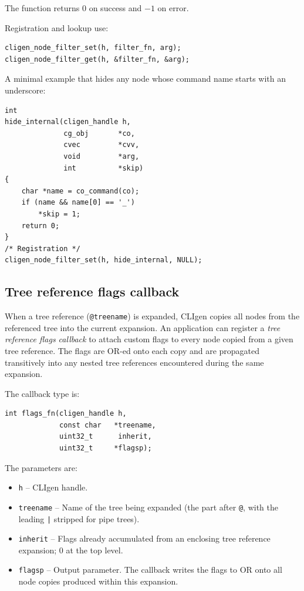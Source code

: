 \documentclass[a4paper, 10pt] {article}
\begin{document}
The function returns 0 on success and $-1$ on error.

Registration and lookup use:
\begin{verbatim}
cligen_node_filter_set(h, filter_fn, arg);
cligen_node_filter_get(h, &filter_fn, &arg);
\end{verbatim}

A minimal example that hides any node whose command name starts with an
underscore:
\begin{verbatim}
int
hide_internal(cligen_handle h,
              cg_obj       *co,
              cvec         *cvv,
              void         *arg,
              int          *skip)
{
    char *name = co_command(co);
    if (name && name[0] == '_')
        *skip = 1;
    return 0;
}
/* Registration */
cligen_node_filter_set(h, hide_internal, NULL);
\end{verbatim}

\subsection{Tree reference flags callback}
\label{sec:treeref-flags}

When a tree reference ({\tt @treename}) is expanded, CLIgen copies all nodes
from the referenced tree into the current expansion.  An application can
register a \emph{tree reference flags callback} to attach custom flags to every
node copied from a given tree reference.  The flags are OR-ed onto each copy
and are propagated transitively into any nested tree references encountered
during the same expansion.

The callback type is:
\begin{verbatim}
int flags_fn(cligen_handle h,
             const char   *treename,
             uint32_t      inherit,
             uint32_t     *flagsp);
\end{verbatim}

The parameters are:
\begin{itemize}
\item {\tt h} -- CLIgen handle.
\item {\tt treename} -- Name of the tree being expanded (the part after {\tt @},
  with the leading {\tt |} stripped for pipe trees).
\item {\tt inherit} -- Flags already accumulated from an enclosing tree
  reference expansion; 0 at the top level.
\item {\tt flagsp} -- Output parameter. The callback writes the flags to OR
  onto all node copies produced within this expansion.
\end{itemize}
\end{document}
